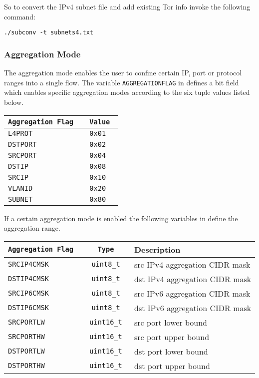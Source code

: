 So to convert the IPv4 subnet file and add existing Tor info invoke the following command:

\begin{center}
{\tt ./subconv -t subnets4.txt}
\end{center}


\subsubsection{Aggregation Mode}
The aggregation mode enables the user to confine certain IP, port or protocol ranges into a single flow. The variable {\tt AGGREGATIONFLAG} in  defines a
bit field which enables specific aggregation modes according to the six tuple values listed below.
\begin{longtable}{>{\tt}l>{\tt}l}
    \toprule
    {\bf Aggregation Flag} & {\bf Value} \\
    \midrule\endhead%
    L4PROT  & 0x01 \\
    DSTPORT & 0x02 \\
    SRCPORT & 0x04 \\
    DSTIP   & 0x08 \\
    SRCIP   & 0x10 \\
    VLANID  & 0x20 \\
    SUBNET  & 0x80 \\
    \bottomrule
\end{longtable}

If a certain aggregation mode is enabled the following variables in 
define the aggregation range.
\begin{longtable}{>{\tt}l>{\tt}cl}
    \toprule
    {\bf Aggregation Flag} & {\bf Type} & {\bf Description}\\
    \midrule\endhead%
    SRCIP4CMSK & uint8\_t  & src IPv4 aggregation CIDR mask \\
    DSTIP4CMSK & uint8\_t  & dst IPv4 aggregation CIDR mask \\
    SRCIP6CMSK & uint8\_t  & src IPv6 aggregation CIDR mask \\
    DSTIP6CMSK & uint8\_t  & dst IPv6 aggregation CIDR mask \\
    SRCPORTLW  & uint16\_t & src port lower bound \\
    SRCPORTHW  & uint16\_t & src port upper bound \\
    DSTPORTLW  & uint16\_t & dst port lower bound \\
    DSTPORTHW  & uint16\_t & dst port upper bound \\
    \bottomrule
\end{longtable}

